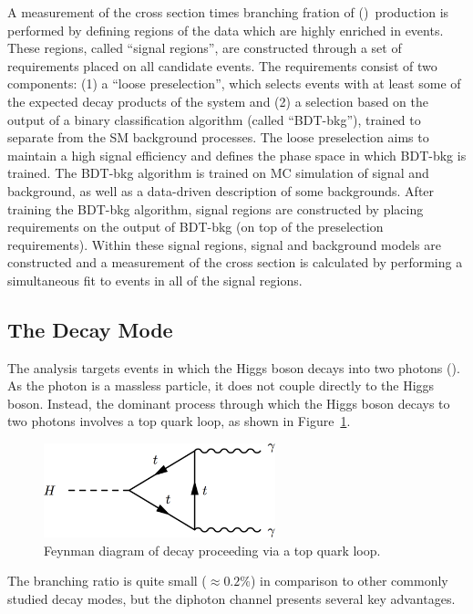 A measurement of the cross section times branching fration of \ttH (\Hgg)~production is performed by defining regions of the data which are highly enriched in \ttH events. These regions, called ``signal regions'', are constructed through a set of requirements placed on all candidate events. 
The requirements consist of two components: 
(1) a ``loose preselection'', which selects events with at least some of the expected decay products of the \ttH system and 
(2) a selection based on the output of a binary classification algorithm (called ``BDT-bkg''), trained to separate \ttH from the SM background processes. The loose preselection aims to maintain a high signal efficiency and defines the phase space in which BDT-bkg is trained.
The BDT-bkg algorithm is trained on MC simulation of signal and background, as well as a data-driven description of some backgrounds. After training the BDT-bkg algorithm, signal regions are constructed by placing requirements on the output of BDT-bkg (on top of the preselection requirements).
Within these signal regions, signal and background models are constructed and a measurement of the \ttH cross section is calculated by performing a simultaneous fit to events in all of the signal regions. 
%
\subsection{The \Hgg Decay Mode}
The analysis targets \ttH events in which the Higgs boson decays into two photons (\Hgg). As the photon is a massless particle, it does not couple directly to the Higgs boson.
Instead, the dominant process through which the Higgs boson decays to two photons involves a top quark loop, as shown in Figure~\ref{fig:hgg_feynman}.
\begin{figure}[h!]
    \centering
    \includegraphics[width=0.6\textwidth]{figures/feynman_diagrams/hgg}
    \caption{Feynman diagram of \Hgg decay proceeding via a top quark loop.}
    \label{fig:hgg_feynman}
\end{figure}
The \Hgg branching ratio is quite small ($\approx 0.2\%$) in comparison to other commonly studied decay modes, but the diphoton channel presents several key advantages.

